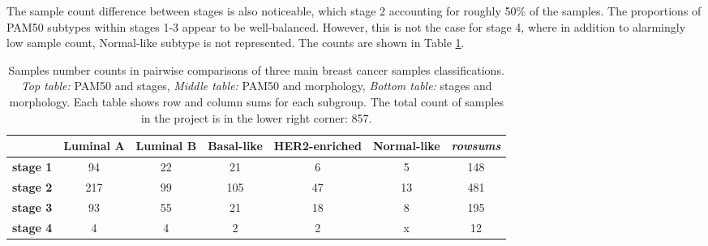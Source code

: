     The sample count difference between stages is also noticeable, which stage 2 accounting for roughly 50\% of the samples. The proportions of PAM50 subtypes within stages 1-3 appear to be well-balanced. However, this is not the case for stage 4, where in addition to alarmingly low sample count, Normal-like subtype is not represented. The counts are shown in Table \ref{table:counts}.  \\
        
        
                \begin{table}[!h]
                \centering
                \tiny
                \caption{Samples number counts in pairwise comparisons of three main breast cancer samples classifications. \textit{Top table:} PAM50 and stages,\textit{ Middle table:} PAM50 and morphology, \textit{Bottom table:} stages and morphology. Each table shows row and column sums for each subgroup. The total count of samples in the project is in the lower right corner: 857.}
                \label{table:counts}      
                \begin{tabular}{ccccccc}
                \multicolumn{1}{l|}{} & \multicolumn{1}{c|}{\textbf{Luminal A}} & \multicolumn{1}{c|}{\textbf{Luminal B}} & \multicolumn{1}{c|}{\textbf{Basal-like}} & \multicolumn{1}{c|}{\textbf{HER2-enriched}} & \multicolumn{1}{c|}{\textbf{Normal-like}} & {\color[HTML]{9B9B9B} \textit{rowsums}} \\ \hline
                \multicolumn{1}{c|}{\textbf{stage 1}} & \multicolumn{1}{c|}{94} & \multicolumn{1}{c|}{22} & \multicolumn{1}{c|}{21} & \multicolumn{1}{c|}{6} & \multicolumn{1}{c|}{5} & \multicolumn{1}{c|}{{\color[HTML]{656565} 148}} \\ \hline
                \multicolumn{1}{c|}{\textbf{stage 2}} & \multicolumn{1}{c|}{217} & \multicolumn{1}{c|}{99} & \multicolumn{1}{c|}{105} & \multicolumn{1}{c|}{47} & \multicolumn{1}{c|}{13} & \multicolumn{1}{c|}{{\color[HTML]{656565} 481}} \\ \hline
                \multicolumn{1}{c|}{\textbf{stage 3}} & \multicolumn{1}{c|}{93} & \multicolumn{1}{c|}{55} & \multicolumn{1}{c|}{21} & \multicolumn{1}{c|}{18} & \multicolumn{1}{c|}{8} & \multicolumn{1}{c|}{{\color[HTML]{656565} 195}} \\ \hline
                \multicolumn{1}{c|}{\textbf{stage 4}} & \multicolumn{1}{c|}{4} & \multicolumn{1}{c|}{4} & \multicolumn{1}{c|}{2} & \multicolumn{1}{c|}{2} & \multicolumn{1}{c|}{{\color[HTML]{C0C0C0} x}} & \multicolumn{1}{c|}{{\color[HTML]{656565} 12}} \\ \hline

\end{tabular}
\end{table}
